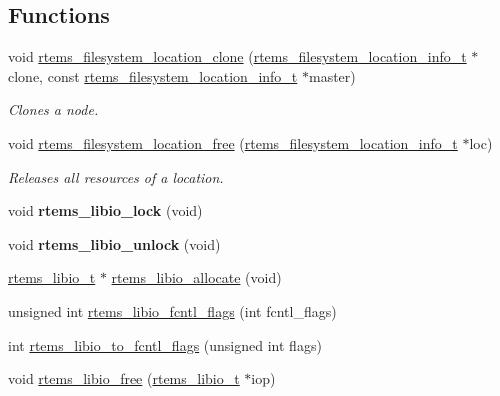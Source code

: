 \subsection*{Functions}
\begin{DoxyCompactItemize}
\item 
void \mbox{\hyperlink{group__LibIOInternal_gab454a726bf3325246734f547ab2a3705}{rtems\+\_\+filesystem\+\_\+location\+\_\+clone}} (\mbox{\hyperlink{group__LibIO_ga3252b3d31ee3c49ffff0b7604a676864}{rtems\+\_\+filesystem\+\_\+location\+\_\+info\+\_\+t}} $\ast$clone, const \mbox{\hyperlink{group__LibIO_ga3252b3d31ee3c49ffff0b7604a676864}{rtems\+\_\+filesystem\+\_\+location\+\_\+info\+\_\+t}} $\ast$master)
\begin{DoxyCompactList}\small\item\em Clones a node. \end{DoxyCompactList}\item 
void \mbox{\hyperlink{group__LibIOInternal_ga9b7b1dc3036af3d9e03ce5723420f9c4}{rtems\+\_\+filesystem\+\_\+location\+\_\+free}} (\mbox{\hyperlink{group__LibIO_ga3252b3d31ee3c49ffff0b7604a676864}{rtems\+\_\+filesystem\+\_\+location\+\_\+info\+\_\+t}} $\ast$loc)
\begin{DoxyCompactList}\small\item\em Releases all resources of a location. \end{DoxyCompactList}\item 
\mbox{\label{group__LibIOInternal_ga12b4b45fb45758475cfbfa8606c7ae9d}} 
void {\bfseries rtems\+\_\+libio\+\_\+lock} (void)
\item 
\mbox{\label{group__LibIOInternal_gac22d5afbe375148eef15304958bc4cec}} 
void {\bfseries rtems\+\_\+libio\+\_\+unlock} (void)
\item 
\mbox{\hyperlink{structrtems__libio__tt}{rtems\+\_\+libio\+\_\+t}} $\ast$ \mbox{\hyperlink{group__LibIOInternal_ga2021231771d73c426958cf0bb7400666}{rtems\+\_\+libio\+\_\+allocate}} (void)
\item 
unsigned int \mbox{\hyperlink{group__LibIOInternal_ga0f1f1dcc65233793d22aa713c4709020}{rtems\+\_\+libio\+\_\+fcntl\+\_\+flags}} (int fcntl\+\_\+flags)
\item 
int \mbox{\hyperlink{group__LibIOInternal_ga86d5bf2c994da708cbd613aa2bb80d16}{rtems\+\_\+libio\+\_\+to\+\_\+fcntl\+\_\+flags}} (unsigned int flags)
\item 
void \mbox{\hyperlink{group__LibIOInternal_gac127d757d9117617d438a18f83eafac8}{rtems\+\_\+libio\+\_\+free}} (\mbox{\hyperlink{structrtems__libio__tt}{rtems\+\_\+libio\+\_\+t}} $\ast$iop)

\end{DoxyCompactItemize}
